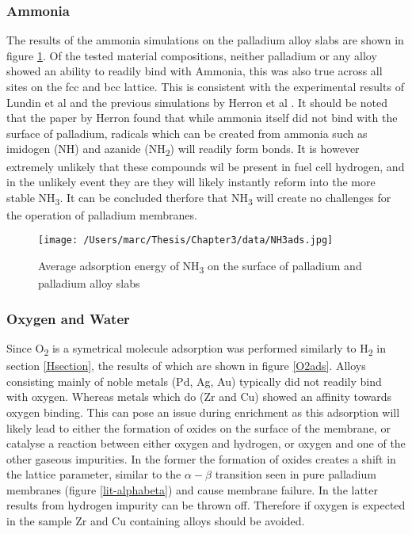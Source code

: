 \subsubsection{Ammonia}
The results of the ammonia simulations on the palladium alloy slabs are shown in figure \ref{nh3ads}. Of the tested material compositions, neither palladium or any alloy showed an ability to readily bind with Ammonia, this was also true across all sites on the fcc and bcc lattice. This is consistent with the experimental results of Lundin et al \cite{Lundin2016} and the previous simulations by Herron et al \cite{HERRON20121670}. It should be noted that the paper by Herron \cite{HERRON20121670} found that while ammonia itself did not bind with the surface of palladium, radicals which can be created from ammonia such as imidogen (NH) and azanide (NH\textsubscript{2}) will readily form bonds. It is however extremely unlikely that these compounds wil be present in fuel cell hydrogen, and in the unlikely event they are they will likely instantly reform into the more stable NH\textsubscript{3}. It can be concluded therfore that NH\textsubscript{3} will create no challenges for the operation of palladium membranes. 

  \begin{figure}
      \centering
      \texttt{[image: /Users/marc/Thesis/Chapter3/data/NH3ads.jpg]}
      \caption{Average adsorption energy of NH\textsubscript{3} on the surface of palladium and palladium alloy slabs}
      \label{nh3ads}
    \end{figure}
  
\subsubsection{Oxygen and Water}
Since O\textsubscript{2} is a symetrical molecule adsorption was performed similarly to H\textsubscript{2} in section \ref{Hsection}, the results of which are shown in figure \ref{O2ads}. Alloys consisting mainly of noble metals (Pd, Ag, Au) typically did not readily bind with oxygen. Whereas metals which do (Zr and Cu) showed an affinity towards oxygen binding. This can pose an issue during enrichment as this adsorption will likely lead to either the formation of oxides on the surface of the membrane, or catalyse a reaction between either oxygen and hydrogen, or oxygen and one of the other gaseous impurities. In the former the formation of oxides creates a shift in the lattice parameter, similar to the $\alpha - \beta$ transition seen in pure palladium membranes (figure \ref{lit-alphabeta})\cite{Li2008b} and cause membrane failure. In the latter results from hydrogen impurity can be thrown off. Therefore if oxygen is expected in the sample Zr and Cu containing alloys should be avoided.

